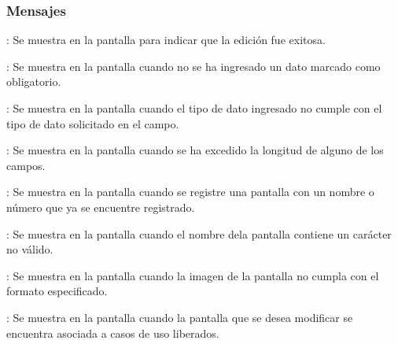 \subsubsection{Mensajes}

\begin{Citemize}
	\item {}: Se muestra en la pantalla  para indicar que la edición fue exitosa.
	\item {}: Se muestra en la pantalla  cuando no se ha ingresado un dato marcado como obligatorio.
	\item {}: Se muestra en la pantalla  cuando el tipo de dato ingresado no cumple con el tipo de dato solicitado en el campo.
	\item {}: Se muestra en la pantalla  cuando se ha excedido la longitud de alguno de los campos.
	\item {}: Se muestra en la pantalla  cuando se registre una pantalla con un nombre o número que ya se encuentre registrado.
	\item {}: Se muestra en la pantalla  cuando el nombre dela pantalla contiene un carácter no válido.
	\item {}: Se muestra en la pantalla  cuando la imagen de la pantalla no cumpla con el formato especificado.
	\item {}: Se muestra en la pantalla  cuando la pantalla que se desea modificar se encuentra asociada a casos de uso liberados.
\end{Citemize}
